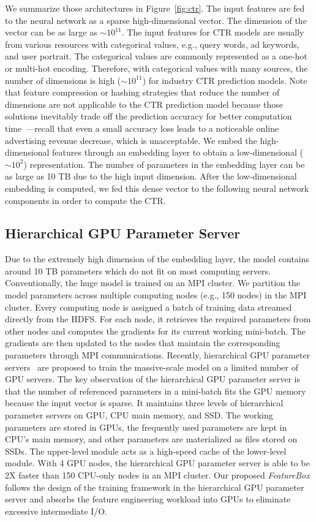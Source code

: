 \documentclass[sigconf]{acmart}
\begin{document}
We summarize those architectures in Figure~\ref{fig:ctr}. The input features are fed to the neural network as a sparse high-dimensional vector. The dimension of the vector can be as large as $\sim 10^{11}$. The input features for CTR models are usually from various resources with categorical values, e.g., query words, ad keywords, and user portrait. The categorical values are commonly represented as a one-hot or multi-hot encoding. Therefore, with categorical values with many sources, the number of dimensions is high ($\sim 10^{11}$) for industry CTR prediction models. Note that feature compression or hashing strategies that reduce the number of dimensions are not applicable to the CTR prediction model because those solutions inevitably trade off the prediction accuracy for better computation time~\cite{Article:Goemans_JACM95,Proc:Weinberger_ICML09,deng2021deeplight}---recall that even a small accuracy loss leads to a noticeable online advertising revenue decrease, which is unacceptable. We embed the high-dimensional features through an embedding layer to obtain a low-dimensional ($\sim 10^2$) representation. The number of parameters in the embedding layer can be as large as 10 TB due to the high input dimension. 
After the low-dimensional embedding is computed, we fed this dense vector to the following neural network components in order to compute the CTR. 

\subsection{Hierarchical GPU Parameter Server}
Due to the extremely high dimension of the embedding layer, the model contains around 10 TB parameters which do not fit on most computing servers. Conventionally, the huge model is trained on an MPI cluster. We partition the model parameters across multiple computing nodes (e.g., 150 nodes) in the MPI cluster. Every computing node is assigned a batch of training data streamed directly from the HDFS. 
For each node, it retrieves the required parameters from other nodes and computes the gradients for its current working mini-batch. The gradients are then updated to the nodes that maintain the corresponding parameters through MPI communications. Recently, hierarchical GPU parameter servers~\cite{Proc:Zhao_MLSys20} are proposed to train the massive-scale model on a limited number of GPU servers. The key observation of the hierarchical GPU parameter server is that the number of referenced parameters in a mini-batch fits the GPU memory because the input vector is sparse. It maintains three levels of hierarchical parameter servers on GPU, CPU main memory, and SSD. The working parameters are stored in GPUs, the frequently used parameters are kept in CPU's main memory, and other parameters are materialized as files stored on SSDs. The upper-level module acts as a high-speed cache of the lower-level module. With 4 GPU nodes, the hierarchical GPU parameter server is able to be 2X faster than 150 CPU-only nodes in an MPI cluster. 
Our proposed \emph{FeatureBox} follows the design of the training framework in the hierarchical GPU parameter server and absorbs the feature engineering workload into GPUs to eliminate excessive intermediate I/O.
\end{document}
